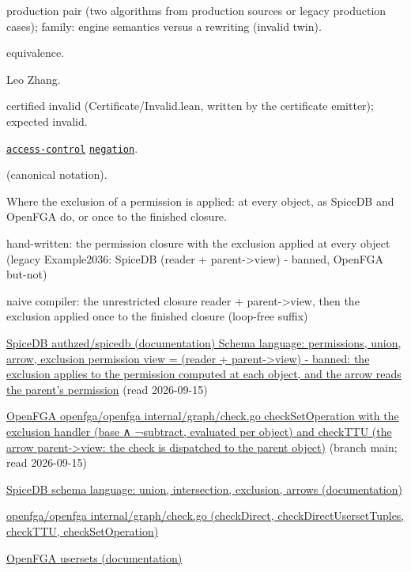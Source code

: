 \documentclass[10pt]{article}
\begin{document}
\begin{description}[leftmargin=2.6cm,style=nextline,itemsep=1pt]

\item[Category] production pair (two algorithms from production sources or legacy production cases); family: engine semantics versus a rewriting (invalid twin).

\item[Kind] equivalence.

\item[Contributors] Leo Zhang.

\item[Status] certified invalid (Certificate/Invalid.lean, written by the certificate emitter); expected invalid.

\item[Tags] \hyperref[tag:access-control]{\texttt{access-control}} \hyperref[tag:negation]{\texttt{negation}}.

\item[Input]  (canonical notation).

\item[Summary] Where the exclusion of a permission is applied: at every object, as SpiceDB and OpenFGA do, or once to the finished closure.

\item[Sides] hand-written: the permission closure with the exclusion applied at every object (legacy Example2036: SpiceDB (reader + parent-\textgreater{}view) - banned, OpenFGA but-not) \par naive compiler: the unrestricted closure reader + parent-\textgreater{}view, then the exclusion applied once to the finished closure (loop-free suffix)

\item[Sources] {\raggedright \href{https://authzed.com/docs/spicedb/concepts/schema}{SpiceDB authzed/spicedb (documentation) Schema language: permissions, union, arrow, exclusion permission view = (reader + parent-\textgreater{}view) - banned: the exclusion applies to the permission computed at each object, and the arrow reads the parent's permission} (read 2026-09-15) \par \href{https://github.com/openfga/openfga/blob/main/internal/graph/check.go}{OpenFGA openfga/openfga internal/graph/check.go checkSetOperation with the exclusion handler (base ∧ ¬subtract, evaluated per object) and checkTTU (the arrow parent-\textgreater{}view: the check is dispatched to the parent object)} (branch main; read 2026-09-15) \par \href{https://authzed.com/docs/spicedb/concepts/schema}{SpiceDB schema language: union, intersection, exclusion, arrows (documentation)} \par \href{https://github.com/openfga/openfga/blob/main/internal/graph/check.go}{openfga/openfga internal/graph/check.go (checkDirect, checkDirectUsersetTuples, checkTTU, checkSetOperation)} \par \href{https://openfga.dev/docs/modeling/building-blocks/usersets}{OpenFGA usersets (documentation)}\par}


\end{description}
\end{document}
